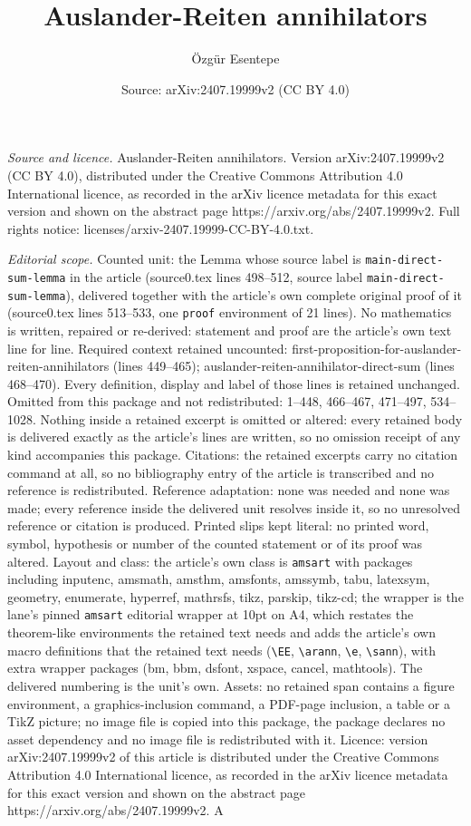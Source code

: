 \documentclass[10pt,a4paper]{amsart}
\title[Auslander-Reiten annihilators]{Auslander-Reiten annihilators}
\author{\"Ozg\"ur Esentepe}
\date{Source: arXiv:2407.19999v2 (CC BY 4.0)}
\begin{document}
\maketitle

\noindent\emph{Source and licence.} Auslander-Reiten annihilators. Version arXiv:2407.19999v2 (CC BY 4.0), distributed under the Creative Commons Attribution 4.0 International licence, as recorded in the arXiv licence metadata for this exact version and shown on the abstract page https://arxiv.org/abs/2407.19999v2. Full rights notice: licenses/arxiv-2407.19999-CC-BY-4.0.txt.\par\smallskip

\noindent\textit{Editorial scope.} Counted unit: the Lemma whose source label is \texttt{main-direct-sum-lemma} in the article (source0.tex lines 498--512, source label \texttt{main-direct-sum-lemma}), delivered together with the article's own complete original proof of it (source0.tex lines 513--533, one \texttt{proof} environment of 21 lines). No mathematics is written, repaired or re-derived: statement and proof are the article's own text line for line. Required context retained uncounted: first-proposition-for-auslander-reiten-annihilators (lines 449--465); auslander-reiten-annihilator-direct-sum (lines 468--470). Every definition, display and label of those lines is retained unchanged. Omitted from this package and not redistributed: 1--448, 466--467, 471--497, 534--1028. Nothing inside a retained excerpt is omitted or altered: every retained body is delivered exactly as the article's lines are written, so no omission receipt of any kind accompanies this package. Citations: the retained excerpts carry no citation command at all, so no bibliography entry of the article is transcribed and no reference is redistributed. Reference adaptation: none was needed and none was made; every reference inside the delivered unit resolves inside it, so no unresolved reference or citation is produced. Printed slips kept literal: no printed word, symbol, hypothesis or number of the counted statement or of its proof was altered. Layout and class: the article's own class is \texttt{amsart} with packages including inputenc, amsmath, amsthm, amsfonts, amssymb, tabu, latexsym, geometry, enumerate, hyperref, mathrsfs, tikz, parskip, tikz-cd; the wrapper is the lane's pinned \texttt{amsart} editorial wrapper at 10pt on A4, which restates the theorem-like environments the retained text needs and adds the article's own macro definitions that the retained text needs (\texttt{\textbackslash EE}, \texttt{\textbackslash arann}, \texttt{\textbackslash e}, \texttt{\textbackslash sann}), with extra wrapper packages (bm, bbm, dsfont, xspace, cancel, mathtools). The delivered numbering is the unit's own. Assets: no retained span contains a figure environment, a graphics-inclusion command, a PDF-page inclusion, a table or a TikZ picture; no image file is copied into this package, the package declares no asset dependency and no image file is redistributed with it. Licence: version arXiv:2407.19999v2 of this article is distributed under the Creative Commons Attribution 4.0 International licence, as recorded in the arXiv licence metadata for this exact version and shown on the abstract page https://arxiv.org/abs/2407.19999v2. A 
\end{document}
